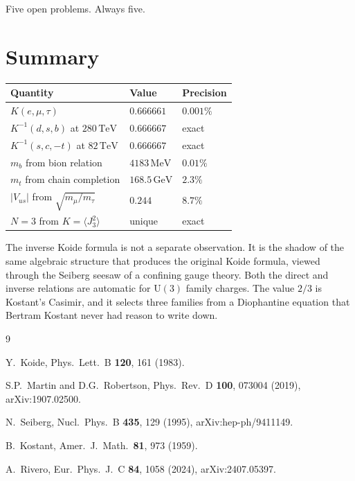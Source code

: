 \documentclass[11pt,a4paper]{article}
\newcommand{\MeV}{\,\mathrm{MeV}}
\newcommand{\GeV}{\,\mathrm{GeV}}
\newcommand{\TeV}{\,\mathrm{TeV}}
\begin{document}
Five open problems. Always five.


\section*{Summary}

\begin{center}
\renewcommand{\arraystretch}{1.3}
\begin{tabular}{lll}
\toprule
Quantity & Value & Precision \\
\midrule
$K(e, \mu, \tau)$ & $0.666661$ & $0.001\%$ \\
$K^{-1}(d, s, b)$ at $280\TeV$ & $0.666667$ & exact \\
$K^{-1}(s, c, -t)$ at $82\TeV$ & $0.666667$ & exact \\
$m_b$ from bion relation & $4183\MeV$ & $0.01\%$ \\
$m_t$ from chain completion & $168.5\GeV$ & $2.3\%$ \\
$|V_{us}|$ from $\sqrt{m_\mu/m_\tau}$ & $0.244$ & $8.7\%$ \\
\midrule
$N = 3$ from $K = \langle J_3^2 \rangle$ & unique & exact \\
\bottomrule
\end{tabular}
\end{center}

The inverse Koide formula is not a separate observation.
It is the shadow of the same algebraic structure that produces
the original Koide formula, viewed through the Seiberg seesaw
of a confining gauge theory. Both the direct and inverse
relations are automatic for $\mathrm{U}(3)$ family charges.
The value $2/3$ is Kostant's Casimir, and it selects three
families from a Diophantine equation that Bertram Kostant never
had reason to write down.


\begin{thebibliography}{9}

  Y.~Koide,
  Phys.\ Lett.\ B \textbf{120}, 161 (1983).

  S.P.~Martin and D.G.~Robertson,
  Phys.\ Rev.\ D \textbf{100}, 073004 (2019),
  arXiv:1907.02500.

  N.~Seiberg,
  Nucl.\ Phys.\ B \textbf{435}, 129 (1995),
  arXiv:hep-ph/9411149.

  B.~Kostant,
  Amer.\ J.\ Math.\ \textbf{81}, 973 (1959).

  A.~Rivero,
  Eur.\ Phys.\ J.\ C \textbf{84}, 1058 (2024),
  arXiv:2407.05397.

\end{thebibliography}
\end{document}
